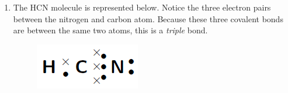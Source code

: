 {\begin{mdframed}[linewidth=4, leftmargin=40, rightmargin=40]
\begin{exercise}
\begin{enumerate}[noitemsep, label=\textbf{Step} \textbf{\arabic*}. ]
\begin{figure}[H]
\begin{center}
      \vspace{2pt}
    \vspace{.1in}
    
    \end{center}

 \end{figure}   

    \addtocounter{footnote}{-0}
    
      \item  
      \label{m38701*id140504}The \begin{math}\mathrm{HCN}\end{math} molecule is represented below. Notice the three electron pairs between the nitrogen and carbon atom. Because these three covalent bonds are between the same two atoms, this is a \textsl{triple} bond.\par 
      
    \setcounter{subfigure}{0}


	\begin{figure}[H] %
    \begin{center}
    \label{m38701*uid18!!!underscore!!!media}\label{m38701*uid18!!!underscore!!!printimage}\includegraphics{col11305.imgs/m38701_CG11C1_012.png} %
        
      \vspace{2pt}
    \vspace{.1in}
    
    \end{center}

 \end{figure}   

    \addtocounter{footnote}{-0}
    
      
      \end{enumerate}
         

    \end{exercise}
    \end{mdframed}
    }
    \noindent
  
\label{m38701*secfhsst!!!underscore!!!id271}\vspace{.5cm} 
      
